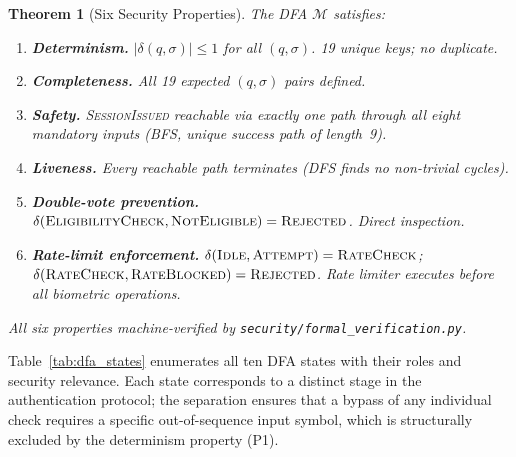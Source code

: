 \documentclass[conference]{IEEEtran}
\newtheorem{theorem}{Theorem}
\begin{document}
\begin{theorem}[Six Security Properties]
The DFA \(\mathcal{M}\) satisfies:
\begin{enumerate}[label=\textbf{P\arabic*.},leftmargin=*]
  \item \textbf{Determinism.} \(|\delta(q,\sigma)| \leq 1\) for all
    \((q,\sigma)\). \textit{19 unique keys; no duplicate.}
  \item \textbf{Completeness.} All 19 expected \((q,\sigma)\) pairs defined.
  \item \textbf{Safety.} \textsc{SessionIssued} reachable via exactly one
    path through all eight mandatory inputs (BFS, unique success path of
    length~9).
  \item \textbf{Liveness.} Every reachable path terminates (DFS finds no
    non-trivial cycles).
  \item \textbf{Double-vote prevention.}
    \(\delta(\textsc{EligibilityCheck}, \textsc{NotEligible}) =
    \textsc{Rejected}\). Direct inspection.
  \item \textbf{Rate-limit enforcement.}
    \(\delta(\textsc{Idle}, \textsc{Attempt}) = \textsc{RateCheck}\);
    \(\delta(\textsc{RateCheck}, \textsc{RateBlocked}) = \textsc{Rejected}\).
    Rate limiter executes before all biometric operations.
\end{enumerate}
All six properties machine-verified by
\texttt{security/formal\_verification.py}.
\end{theorem}

Table~\ref{tab:dfa_states} enumerates all ten DFA states with their
roles and security relevance. Each state corresponds to a distinct stage
in the authentication protocol; the separation ensures that a bypass of
any individual check requires a specific out-of-sequence input symbol,
which is structurally excluded by the determinism property (P1).
\end{document}
